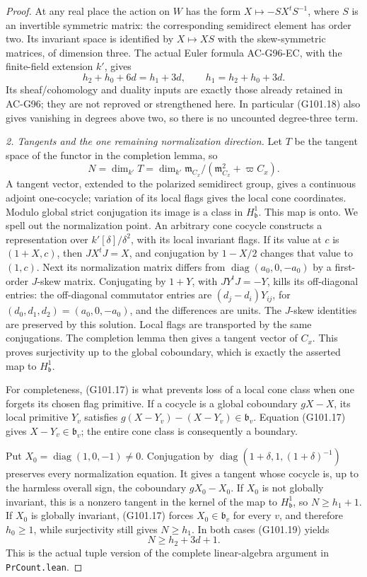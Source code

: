 \begin{proof}
At any real place the action on \(W\) has the form
\(X\mapsto-SX^tS^{-1}\), where \(S\) is an invertible
symmetric matrix: the corresponding semidirect element has
order two.  Its invariant space is identified by \(X\mapsto XS\)
with the skew-symmetric matrices, of dimension three.
The actual Euler formula AC-G96-EC, with the finite-field
extension \(k'\), gives
\[
 h_2+h_0+6d=h_1+3d,\qquad
                   h_1=h_2+h_0+3d.
 \tag{G101.19}
\]
Its sheaf/cohomology and duality inputs are exactly those already
retained in AC-G96; they are not reproved or strengthened here.
In particular (G101.18) also gives vanishing in degrees
above two, so there is no uncounted degree-three term.

\emph{2. Tangents and the one remaining normalization direction.}
Let \(T\) be the tangent space of the functor in the completion
lemma, so
\[
       N=\dim_{k'}T
          =\dim_{k'}\mathfrak m_{C_x}/
                      (\mathfrak m_{C_x}^2+\varpi C_x).
 \tag{G101.20}
\]
A tangent vector, extended to the polarized semidirect group,
gives a continuous adjoint one-cocycle; variation of its local
flags gives the local cone coordinates.  Modulo global strict
conjugation its image is a class in \(H^1_{\mathfrak b}\).
This map is onto.  We spell out the normalization point.
An arbitrary cone cocycle constructs a representation over
\(k'[\delta]/\delta^2\), with its local invariant flags.
If its value at \(c\) is \((1+X,c)\), then
\(JX^tJ=X\), and conjugation by \(1-X/2\) changes that value
to \((1,c)\).  Next its normalization matrix differs from
\(\operatorname{diag}(a_0,0,-a_0)\) by a first-order
\(J\)-skew matrix.  Conjugating by \(1+Y\), with
\(JY^tJ=-Y\), kills its off-diagonal entries:
the off-diagonal commutator entries are
\((d_j-d_i)Y_{ij}\), for
\((d_0,d_1,d_2)=(a_0,0,-a_0)\), and the differences
are units.  The \(J\)-skew identities are preserved by this
solution.  Local flags are transported by the same conjugations.
The completion lemma then gives a tangent vector of \(C_x\).
This proves surjectivity up to the global coboundary, which is
exactly the asserted map to \(H^1_{\mathfrak b}\).

For completeness, (G101.17) is what prevents loss of a local
cone class when one forgets its chosen flag primitive.
If a cocycle is a global coboundary \(gX-X\), its local
primitive \(Y_v\) satisfies
\(g(X-Y_v)-(X-Y_v)\in\mathfrak b_v\).
Equation (G101.17) gives \(X-Y_v\in\mathfrak b_v\);
the entire cone class is consequently a boundary.

Put \(X_0=\operatorname{diag}(1,0,-1)\ne0\).
Conjugation by \(\operatorname{diag}(1+\delta,1,(1+\delta)^{-1})\)
preserves every normalization equation.  It gives a tangent
whose cocycle is, up to the harmless overall sign,
the coboundary \(gX_0-X_0\).
If \(X_0\) is not globally invariant, this is a nonzero tangent
in the kernel of the map to \(H^1_{\mathfrak b}\), so
\(N\ge h_1+1\).
If \(X_0\) is globally invariant, (G101.17) forces
\(X_0\in\mathfrak b_v\) for every \(v\), and therefore
\(h_0\ge1\), while surjectivity still gives \(N\ge h_1\).
In both cases (G101.19) yields
\[
                            N\ge h_2+3d+1.
 \tag{G101.21}
\]
This is the actual tuple version of the complete linear-algebra
argument in \texttt{PrCount.lean}.


\end{proof}
